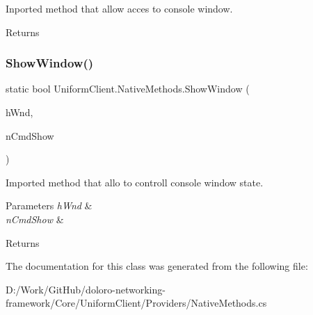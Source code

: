Inported method that allow acces to console window. 

\begin{DoxyReturn}{Returns}

\end{DoxyReturn}
\mbox{\label{class_uniform_client_1_1_native_methods_a067dec2d455070ab352fef3caef7b323}} 
\subsubsection{\texorpdfstring{Show\+Window()}{ShowWindow()}}
{\footnotesize\ttfamily static bool Uniform\+Client.\+Native\+Methods.\+Show\+Window (\begin{DoxyParamCaption}\item[{Int\+Ptr}]{h\+Wnd,  }\item[{int}]{n\+Cmd\+Show }\end{DoxyParamCaption})}



Imported method that allo to controll console window state. 


\begin{DoxyParams}{Parameters}
{\em h\+Wnd} & \\
\hline
{\em n\+Cmd\+Show} & \\
\hline
\end{DoxyParams}
\begin{DoxyReturn}{Returns}

\end{DoxyReturn}


The documentation for this class was generated from the following file\+:\begin{DoxyCompactItemize}
\item 
D\+:/\+Work/\+Git\+Hub/doloro-\/networking-\/framework/\+Core/\+Uniform\+Client/\+Providers/Native\+Methods.\+cs\end{DoxyCompactItemize}
